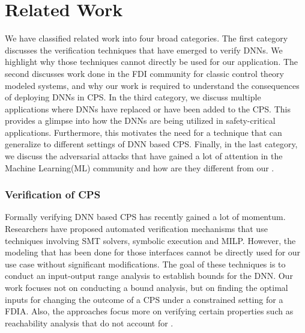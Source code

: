 \chapter{Related Work}
\label{ch:Chapter2}

We have classified related work into four broad categories. The first category discusses the verification techniques that have emerged to verify DNNs. We highlight why those techniques cannot directly be used for our application. The second discusses work done in the FDI community for classic control theory modeled systems, and why our work is required to understand the consequences of deploying DNNs in CPS.  In the third category, we discuss multiple applications where DNNs have replaced or have been added to the CPS. This provides a glimpse into how the DNNs are being utilized in safety-critical applications. Furthermore, this motivates the need for a technique that can generalize to different settings of DNN based CPS. Finally, in the last category, we discuss the adversarial attacks that have gained a lot of attention in the Machine Learning(ML) community and how are they different from our \attack. 
\subsection{Verification of CPS}

Formally verifying DNN based CPS has recently gained a lot of momentum. Researchers have proposed automated verification mechanisms that use techniques involving SMT solvers, symbolic execution and MILP. However, the modeling that has been done for those interfaces cannot be directly used for our use case without significant modifications. The goal of these techniques is to conduct an input-output range analysis to establish bounds for the DNN. Our work focuses not on conducting a bound analysis, but on finding the optimal inputs for changing the outcome of a CPS under a constrained setting for a FDIA. Also, the approaches focus more on verifying certain properties such as reachability analysis that do not account for \attack.

